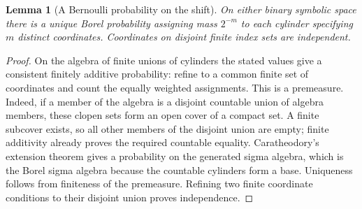 \documentclass[11pt,oneside]{book}
\newtheorem{lemma}[theorem]{Lemma}
\theoremstyle{definition}
\theoremstyle{remark}\newtheorem{remark}[theorem]{Remark}
\begin{document}
\begin{lemma}[A Bernoulli probability on the shift]\label{d13:19:bernoulli-measure}
On either binary symbolic space there is a unique Borel probability
assigning mass \(2^{-m}\) to each cylinder specifying \(m\) distinct
coordinates. Coordinates on disjoint finite index sets are independent.
\end{lemma}
\begin{proof}
On the algebra of finite unions of cylinders the stated values give
a consistent finitely additive probability: refine to a common finite
set of coordinates and count the equally weighted assignments.
This is a premeasure. Indeed, if a member of the algebra is a
disjoint countable union of algebra members, these clopen sets form
an open cover of a compact set. A finite subcover exists, so all
other members of the disjoint union are empty; finite additivity
already proves the required countable equality.
Caratheodory's extension theorem gives a probability on the
generated sigma algebra, which is the Borel sigma algebra because
the countable cylinders form a base. Uniqueness follows from
finiteness of the premeasure. Refining two finite coordinate
conditions to their disjoint union proves independence.
\end{proof}
\end{document}
